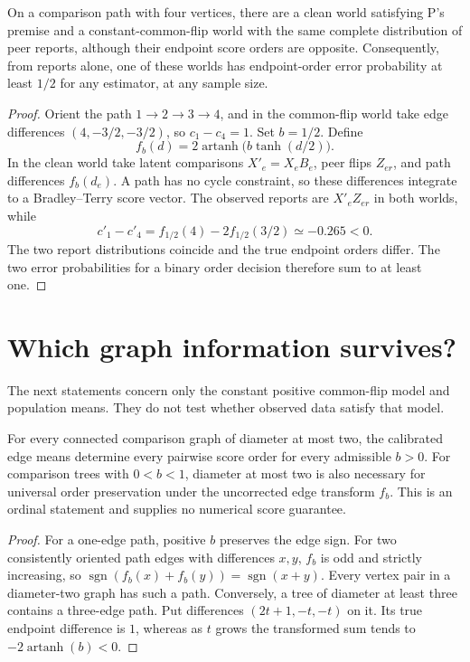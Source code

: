 \documentclass{article}
\begin{document}
\begin{proposition}
On a comparison path with four vertices, there are a clean world satisfying P's premise and a
constant-common-flip world with the same complete distribution of peer reports, although their
endpoint score orders are opposite. Consequently, from reports alone, one of these worlds has
endpoint-order error probability at least \(1/2\) for any estimator, at any sample size. %
\end{proposition}
\begin{proof}
Orient the path \(1\to2\to3\to4\), and in the common-flip world take edge differences
\((4,-3/2,-3/2)\), so \(c_1-c_4=1\). Set \(b=1/2\). Define
\[
f_b(d)=2\operatorname{artanh}\!\bigl(b\tanh(d/2)\bigr).
\]
In the clean world take latent comparisons \(X'_e=X_eB_e\), peer flips \(Z_{er}\), and path
differences \(f_b(d_e)\). A path has no cycle constraint, so these differences integrate to a
Bradley--Terry score vector. The observed reports are \(X'_eZ_{er}\) in both worlds, while
\[
c'_1-c'_4=f_{1/2}(4)-2f_{1/2}(3/2)\simeq-0.265<0.
\]
The two report distributions coincide and the true endpoint orders differ. The two error
probabilities for a binary order decision therefore sum to at least one. %
\end{proof}

\section{Which graph information survives?}
The next statements concern only the constant positive common-flip model and population means. They
do not test whether observed data satisfy that model. %

\begin{proposition}
For every connected comparison graph of diameter at most two, the calibrated edge means determine
every pairwise score order for every admissible \(b>0\). For comparison trees with \(0<b<1\),
diameter at most two is also necessary for universal order preservation under the uncorrected edge
transform \(f_b\). This is an ordinal statement and supplies no numerical score guarantee. %
\end{proposition}
\begin{proof}
For a one-edge path, positive \(b\) preserves the edge sign. For two consistently oriented path
edges with differences \(x,y\), \(f_b\) is odd and strictly increasing, so
\(\operatorname{sgn}(f_b(x)+f_b(y))=\operatorname{sgn}(x+y)\). Every vertex pair in a diameter-two
graph has such a path. Conversely, a tree of diameter at least three contains a three-edge path. Put
differences \((2t+1,-t,-t)\) on it. Its true endpoint difference is \(1\), whereas as \(t\) grows
the transformed sum tends to \(-2\operatorname{artanh}(b)<0\). %
\end{proof}
\end{document}
